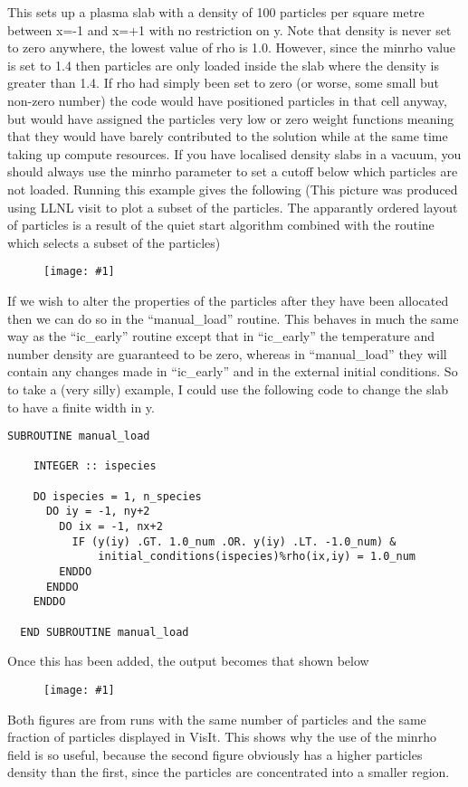 \documentclass[12pt,a4paper]{article}
\newcommand{\simpleboxverbatim}{\begin{Verbatim}[obeytabs=true,frame=single,
  framerule=0.5mm,rulecolor=\color{warwickmid},formatcom=\color{black}]}
\newcommand{\image}[1]
  {{\begin{figure}\centering\texttt{[image: \#1]}\end{figure}}}
\begin{document}
This sets up a plasma slab with a density of 100 particles per square metre
between x=-1 and x=+1 with no restriction on y. Note that density is never set
to zero anywhere, the lowest value of rho is 1.0. However, since the minrho
value is set to 1.4 then particles are only loaded inside the slab where the
density is greater than 1.4. If rho had simply been set to zero (or worse,
some small but non-zero number) the code would have positioned particles in
that cell anyway, but would have assigned the particles very low or zero
weight functions meaning that they would have barely contributed to the
solution while at the same time taking up compute resources. If you have
localised density slabs in a vacuum, you should always use the minrho
parameter to set a cutoff below which particles are not loaded. Running this
example gives the following (This picture was produced using LLNL visit to
plot a subset of the particles. The apparantly ordered layout of particles is
a result of the quiet start algorithm combined with the routine which selects
a subset of the particles)\\
%Example image from visit for these initial conditions
\image{./images/example}

If we wish to alter the properties of the particles after they have been
allocated then we can do so in the ``manual\_load'' routine. This behaves
in much the same way as the ``ic\_early'' routine except that in
``ic\_early'' the temperature and number density are guaranteed to be zero,
whereas in ``manual\_load'' they will contain any changes made in ``ic\_early''
and in the external initial conditions. So to take a (very silly) example, I
could use the following code to change the slab to have a finite width in y.

\simpleboxverbatim
  SUBROUTINE manual_load

    INTEGER :: ispecies

    DO ispecies = 1, n_species
      DO iy = -1, ny+2
        DO ix = -1, nx+2
          IF (y(iy) .GT. 1.0_num .OR. y(iy) .LT. -1.0_num) &
              initial_conditions(ispecies)%rho(ix,iy) = 1.0_num
        ENDDO
      ENDDO
    ENDDO

  END SUBROUTINE manual_load
\end{Verbatim}

Once this has been added, the output becomes that shown below\\
\image{./images/example2.eps}
Both figures are from runs with the same number of particles and the same
fraction of particles displayed in VisIt. This shows why the use of the minrho
field is so useful, because the second figure obviously has a higher particles
density than the first, since the particles are concentrated into a smaller
region.
\end{document}
